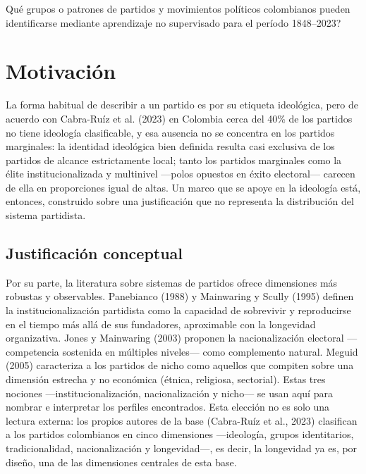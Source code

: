 \documentclass[11pt,letterpaper]{article}
\begin{document}
\textquestiondown{}Qué grupos o patrones de partidos y movimientos políticos colombianos pueden identificarse mediante aprendizaje no supervisado para el período 1848--2023?

\section{Motivación}

La forma habitual de describir a un partido es por su etiqueta ideológica, pero de acuerdo con Cabra-Ruíz et al. (2023) en Colombia cerca del 40\% de los partidos no tiene ideología clasificable, y esa ausencia no se concentra en los partidos marginales: la identidad ideológica bien definida resulta casi exclusiva de los partidos de alcance estrictamente local; tanto los partidos marginales como la élite institucionalizada y multinivel ---polos opuestos en éxito electoral--- carecen de ella en proporciones igual de altas. Un marco que se apoye en la ideología está, entonces, construido sobre una justificación que no representa la distribución del sistema partidista.

\subsection{Justificación conceptual}

Por su parte, la literatura sobre sistemas de partidos ofrece dimensiones más robustas y observables. Panebianco (1988) y Mainwaring y Scully (1995) definen la institucionalización partidista como la capacidad de sobrevivir y reproducirse en el tiempo más allá de sus fundadores, aproximable con la longevidad organizativa. Jones y Mainwaring (2003) proponen la nacionalización electoral ---competencia sostenida en múltiples niveles--- como complemento natural. Meguid (2005) caracteriza a los partidos de nicho como aquellos que compiten sobre una dimensión estrecha y no económica (étnica, religiosa, sectorial). Estas tres nociones ---institucionalización, nacionalización y nicho--- se usan aquí para nombrar e interpretar los perfiles encontrados. Esta elección no es solo una lectura externa: los propios autores de la base (Cabra-Ruíz et al., 2023) clasifican a los partidos colombianos en cinco dimensiones ---ideología, grupos identitarios, tradicionalidad, nacionalización y longevidad---, es decir, la longevidad ya es, por diseño, una de las dimensiones centrales de esta base.
\end{document}
